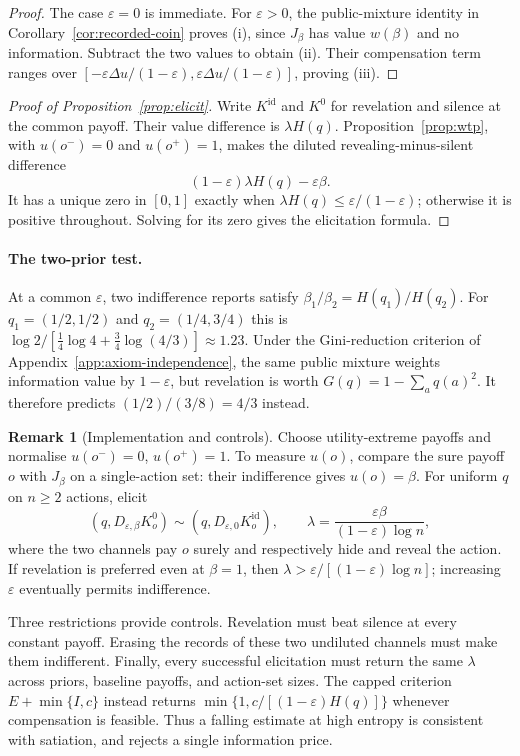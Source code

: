 \documentclass[11pt,a4paper]{article}
\theoremstyle{definition}
\newtheorem{remark}[theorem]{Remark}
\newcommand{\I}{I}
\newcommand{\Sh}{H}
\newcommand{\1}{\mathbf 1}
\begin{document}
\begin{proof}
The case $\varepsilon=0$ is immediate. For $\varepsilon>0$,
the public-mixture identity in Corollary~\ref{cor:recorded-coin} proves
\textup{(i)}, since $J_\beta$ has value $w(\beta)$ and no information.
Subtract the two values to obtain \textup{(ii)}.
Their compensation term ranges over
$[-\varepsilon\Delta u/(1-\varepsilon),
\varepsilon\Delta u/(1-\varepsilon)]$, proving \textup{(iii)}.
\end{proof}

\begin{proof}[Proof of Proposition~\ref{prop:elicit}]
Write $K^{\mathrm{id}}$ and $K^0$ for revelation and silence at the common
payoff. Their value difference is $\lambda\Sh(q)$.
Proposition~\ref{prop:wtp}, with $u(o^-)=0$ and $u(o^+)=1$, makes the
diluted revealing-minus-silent difference
\[
 (1-\varepsilon)\lambda\Sh(q)-\varepsilon\beta.
\]
It has a unique zero in $[0,1]$ exactly when
$\lambda\Sh(q)\le\varepsilon/(1-\varepsilon)$; otherwise it is positive
throughout. Solving for its zero gives the elicitation formula.
\end{proof}

\paragraph{The two-prior test.}
At a common $\varepsilon$, two indifference reports satisfy
$\beta_1/\beta_2=\Sh(q_1)/\Sh(q_2)$.
For $q_1=(1/2,1/2)$ and $q_2=(1/4,3/4)$ this is
$\log2/[\frac14\log4+\frac34\log(4/3)]\approx1.23$.
Under the Gini-reduction criterion of Appendix~\ref{app:axiom-independence},
the same public mixture weights information value by $1-\varepsilon$,
but revelation is worth $G(q)=1-\sum_aq(a)^2$.
It therefore predicts $(1/2)/(3/8)=4/3$ instead.

\begin{remark}[Implementation and controls]\label{rem:elicitation}
Choose utility-extreme payoffs and normalise $u(o^-)=0$, $u(o^+)=1$.
To measure $u(o)$, compare the sure payoff $o$ with $J_\beta$ on a
single-action set: their indifference gives $u(o)=\beta$.
For uniform $q$ on $n\ge2$ actions, elicit
\[
 (q,D_{\varepsilon,\beta}K_o^0)
 \sim(q,D_{\varepsilon,0}K_o^{\mathrm{id}}),
 \qquad
 \lambda=\frac{\varepsilon\beta}{(1-\varepsilon)\log n},
\]
where the two channels pay $o$ surely and respectively hide and reveal
the action. If revelation is preferred even at $\beta=1$, then
$\lambda>\varepsilon/[(1-\varepsilon)\log n]$; increasing $\varepsilon$
eventually permits indifference.

Three restrictions provide controls. Revelation must beat silence at
every constant payoff. Erasing the records of these two undiluted channels
must make them indifferent. Finally, every successful elicitation must
return the same $\lambda$ across priors, baseline payoffs, and action-set
sizes. The capped criterion $E+\min\{\I,c\}$ instead returns
$\min\{1,c/[(1-\varepsilon)\Sh(q)]\}$ whenever compensation is feasible.
Thus a falling estimate at high entropy is consistent with satiation,
and rejects a single information price.
\end{remark}
\end{document}
